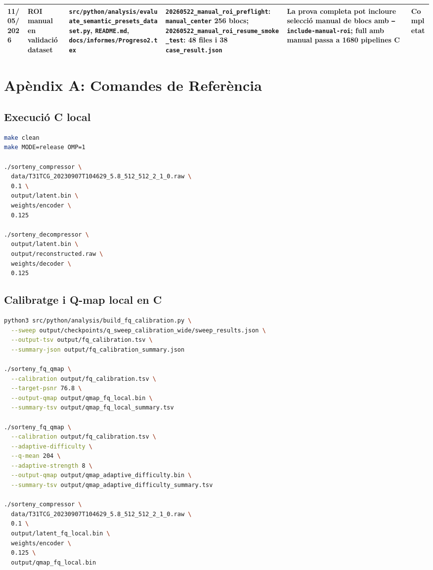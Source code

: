 \documentclass[11pt,a4paper]{article}
\begin{document}
\begin{longtable}{p{1.7cm} p{2.3cm} p{2.6cm} p{2.8cm} p{2.1cm} p{2.0cm}}
11/05/2026 & ROI manual en validació dataset & \texttt{src/python/analysis/evaluate\_semantic\_presets\_dataset.py}, \texttt{README.md}, \texttt{docs/informes/Progreso2.tex} & \texttt{20260522\_manual\_roi\_preflight}: \texttt{manual\_center} 256 blocs; \texttt{20260522\_manual\_roi\_resume\_smoke\_test}: 48 files i 38 \texttt{case\_result.json} & La prova completa pot incloure selecció manual de blocs amb \texttt{--include-manual-roi}; full amb manual passa a 1680 pipelines C & Completat \\
\bottomrule
\end{longtable}

\appendix
\section{Apèndix A: Comandes de Referència}

\subsection{Execució C local}

\begin{lstlisting}[language=bash]
make clean
make MODE=release OMP=1

./sorteny_compressor \
  data/T31TCG_20230907T104629_5.8_512_512_2_1_0.raw \
  0.1 \
  output/latent.bin \
  weights/encoder \
  0.125

./sorteny_decompressor \
  output/latent.bin \
  output/reconstructed.raw \
  weights/decoder \
  0.125
\end{lstlisting}

\subsection{Calibratge i Q-map local en C}

\begin{lstlisting}[language=bash]
python3 src/python/analysis/build_fq_calibration.py \
  --sweep output/checkpoints/q_sweep_calibration_wide/sweep_results.json \
  --output-tsv output/fq_calibration.tsv \
  --summary-json output/fq_calibration_summary.json

./sorteny_fq_qmap \
  --calibration output/fq_calibration.tsv \
  --target-psnr 76.8 \
  --output-qmap output/qmap_fq_local.bin \
  --summary-tsv output/qmap_fq_local_summary.tsv

./sorteny_fq_qmap \
  --calibration output/fq_calibration.tsv \
  --adaptive-difficulty \
  --q-mean 204 \
  --adaptive-strength 8 \
  --output-qmap output/qmap_adaptive_difficulty.bin \
  --summary-tsv output/qmap_adaptive_difficulty_summary.tsv

./sorteny_compressor \
  data/T31TCG_20230907T104629_5.8_512_512_2_1_0.raw \
  0.1 \
  output/latent_fq_local.bin \
  weights/encoder \
  0.125 \
  output/qmap_fq_local.bin
\end{lstlisting}
\end{document}
